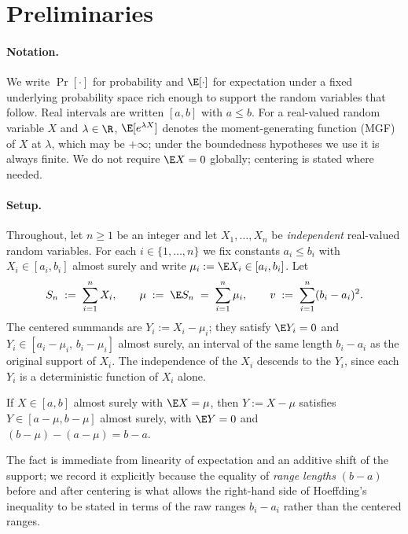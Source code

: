 \section{Preliminaries}
\label{sec:prelim}

\paragraph{Notation.}
We write $\Pr[\cdot]$ for probability and $\E[\cdot]$ for expectation under a fixed
underlying probability space rich enough to support the random variables that follow.
Real intervals are written $[a, b]$ with $a \le b$. For a real-valued random variable
$X$ and $\lambda \in \R$, $\E[e^{\lambda X}]$ denotes the moment-generating function
(MGF) of $X$ at $\lambda$, which may be $+\infty$; under the boundedness hypotheses
we use it is always finite. We do not require $\E X = 0$ globally; centering is
stated where needed.

\paragraph{Setup.}
Throughout, let $n \ge 1$ be an integer and let $X_1, \ldots, X_n$ be
\emph{independent} real-valued random variables. For each $i \in \{1, \ldots, n\}$
we fix constants $a_i \le b_i$ with $X_i \in [a_i, b_i]$ almost surely and write
$\mu_i := \E X_i \in [a_i, b_i]$. Let
\begin{align*}
S_n \;:=\; \sum_{i=1}^n X_i,
\qquad
\mu \;:=\; \E S_n \;=\; \sum_{i=1}^n \mu_i,
\qquad
v \;:=\; \sum_{i=1}^n (b_i - a_i)^2.
\end{align*}
The centered summands are $Y_i := X_i - \mu_i$; they satisfy $\E Y_i = 0$ and
$Y_i \in [a_i - \mu_i,\, b_i - \mu_i]$ almost surely, an interval of the same
length $b_i - a_i$ as the original support of $X_i$. The independence of the $X_i$
descends to the $Y_i$, since each $Y_i$ is a deterministic function of $X_i$ alone.

\begin{fact}\label{fac:range-invariance}
If $X \in [a, b]$ almost surely with $\E X = \mu$, then $Y := X - \mu$ satisfies
$Y \in [a - \mu, b - \mu]$ almost surely, with $\E Y = 0$ and
$(b - \mu) - (a - \mu) = b - a$.
\end{fact}

\noindent
The fact is immediate from linearity of expectation and an additive shift of the
support; we record it explicitly because the equality of \emph{range lengths}
$(b - a)$ before and after centering is what allows the right-hand side of
Hoeffding's inequality to be stated in terms of the raw ranges $b_i - a_i$ rather
than the centered ranges.

